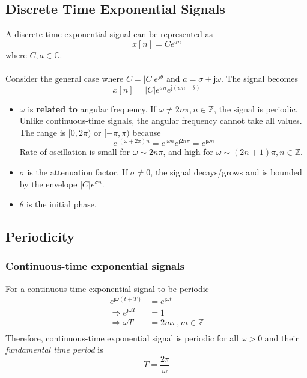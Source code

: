 \documentclass[oneside]{book}
\begin{document}
\subsection{Discrete Time Exponential Signals}
A discrete time exponential signal can be represented as
\begin{equation}
	x[n] = Ce^{an}
\end{equation}
where \(C, a \in \mathbb{C}\).
\\\\
\noindent Consider the general case where \(C = |C|e^{j\theta}\) and \(a = \sigma + \mathsf{j}\omega\). The signal becomes
\[
	x[n] = |C|e^{\sigma n}e^{\mathsf{j}(wn + \theta)}
\]
\begin{itemize}
	\item $\omega$ is \textbf{related to} angular frequency. If \(\omega \neq 2n\pi, n\in\mathbb{Z}\), the signal is periodic.\\
	      Unlike continuous-time signals, the angular frequency cannot take all values. The range is \([0, 2\pi)\) or \([-\pi, \pi)\) because
	      \[
		      e^{\mathsf{j}(\omega + 2\pi)n} = e^{\mathsf{j}\omega n}e^{\mathsf{j}2n\pi} = e^{\mathsf{j}\omega n}
	      \]
	      Rate of oscillation is small for $\omega\sim 2n\pi$, and high for $\omega\sim (2n + 1)\pi, n\in\mathbb{Z}$.
	\item $\sigma$ is the attenuation factor. If \(\sigma \neq 0\), the signal decays/grows and is bounded by the envelope \(|C|e^{\sigma n}\).
	\item $\theta$ is the initial phase.
\end{itemize}

\subsection{Periodicity}
\subsubsection{Continuous-time exponential signals}
For a continuous-time exponential signal to be periodic
\begin{align*}
	e^{\mathsf{j}\omega(t + T)}        & = e^{\mathsf{j}\omega t} \\
	\Rightarrow e^{\mathsf{j}\omega T} & = 1                      \\
	\Rightarrow \omega T               & = 2m\pi, m\in\mathbb{Z}  \\
\end{align*}
Therefore, continuous-time exponential signal is periodic for all $\omega>0$ and their \textit{fundamental time period} is
\[
	T = \frac{2\pi}{\omega}
\]
\end{document}
